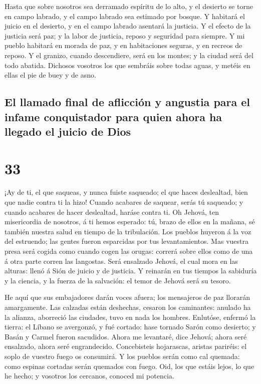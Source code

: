  Hasta que sobre nosotros sea derramado espíritu de lo
alto, y el desierto se torne en campo labrado, y el campo labrado sea
estimado por bosque.  Y habitará el juicio en el
desierto, y en el campo labrado asentará la justicia.  Y
el efecto de la justicia será paz; y la labor de justicia, reposo y
seguridad para siempre.  Y mi pueblo habitará en morada
de paz, y en habitaciones seguras, y en recreos de reposo.
 Y el granizo, cuando descendiere, será en los montes; y
la ciudad será del todo abatida.  Dichosos vosotros los
que sembráis sobre todas aguas, y metéis en ellas el pie de buey y de
asno.

\hypertarget{el-llamado-final-de-aflicciuxf3n-y-angustia-para-el-infame-conquistador-para-quien-ahora-ha-llegado-el-juicio-de-dios}{%
\subsection{El llamado final de aflicción y angustia para el infame
conquistador para quien ahora ha llegado el juicio de
Dios}\label{el-llamado-final-de-aflicciuxf3n-y-angustia-para-el-infame-conquistador-para-quien-ahora-ha-llegado-el-juicio-de-dios}}

\hypertarget{section-32}{%
\section{33}\label{section-32}}

 ¡Ay de ti, el que saqueas, y nunca fuiste saqueado; el
que haces deslealtad, bien que nadie contra ti la hizo! Cuando acabares
de saquear, serás tú saqueado; y cuando acabares de hacer deslealtad,
haráse contra ti.  Oh Jehová, ten misericordia de
nosotros, á ti hemos esperado: tú, brazo de ellos en la mañana, sé
también nuestra salud en tiempo de la tribulación.  Los
pueblos huyeron á la voz del estruendo; las gentes fueron esparcidas por
tus levantamientos.  Mas vuestra presa será cogida como
cuando cogen las orugas: correrá sobre ellos como de una á otra parte
corren las langostas.  Será ensalzado Jehová, el cual mora
en las alturas: llenó á Sión de juicio y de justicia.  Y
reinarán en tus tiempos la sabiduría y la ciencia, y la fuerza de la
salvación: el temor de Jehová será su tesoro.

 He aquí que sus embajadores darán voces afuera; los
mensajeros de paz llorarán amargamente.  Las calzadas
están deshechas, cesaron los caminantes: anulado ha la alianza,
aborreció las ciudades, tuvo en nada los hombres. 
Enlutóse, enfermó la tierra: el Líbano se avergonzó, y fué cortado: hase
tornado Sarón como desierto; y Basán y Carmel fueron sacudidos.
 Ahora me levantaré, dice Jehová; ahora seré ensalzado,
ahora seré engrandecido.  Concebisteis hojarascas,
aristas pariréis: el soplo de vuestro fuego os consumirá.
 Y los pueblos serán como cal quemada: como espinas
cortadas serán quemados con fuego.  Oid, los que estáis
lejos, lo que he hecho; y vosotros los cercanos, conoced mi potencia.

